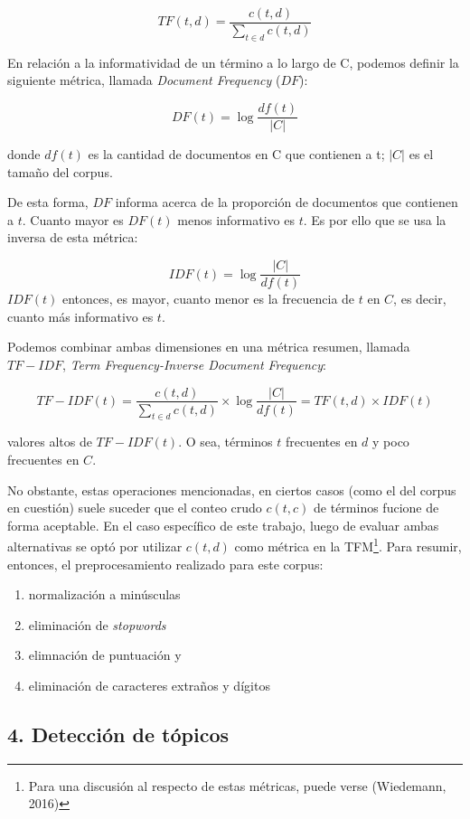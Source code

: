 \documentclass[]{article}
\providecommand{\tightlist}{%
  \setlength{\itemsep}{0pt}\setlength{\parskip}{0pt}}
\let\rmarkdownfootnote\footnote%
\def\footnote{\protect\rmarkdownfootnote}
\begin{document}
\[ TF(t,d) = \frac{c(t,d)}{\sum_{t \in d} c(t,d)}\]

En relación a la informatividad de un término a lo largo de C, podemos
definir la siguiente métrica, llamada \emph{Document Frequency}
(\(DF\)):

\[ DF(t) = \log \frac{df(t)}{|C|}\]

donde \(df(t)\) es la cantidad de documentos en C que contienen a t;
\(|C|\) es el tamaño del corpus.

De esta forma, \(DF\) informa acerca de la proporción de documentos que
contienen a \(t\). Cuanto mayor es \(DF(t)\) menos informativo es \(t\).
Es por ello que se usa la inversa de esta métrica:

\[ IDF(t) = \log \frac{|C|}{df(t)}\] \(IDF(t)\) entonces, es mayor,
cuanto menor es la frecuencia de \(t\) en \(C\), es decir, cuanto más
informativo es \(t\).

Podemos combinar ambas dimensiones en una métrica resumen, llamada
\(TF−IDF\), \emph{Term Frequency-Inverse Document Frequency}:

\[TF-IDF(t) = \frac{c(t,d)}{\sum_{t \in d} c(t,d)} \times \log \frac{|C|}{df(t)} = TF(t,d) \times IDF(t) \]

valores altos de \(TF-IDF(t)\). O sea, términos \(t\) frecuentes en
\(d\) y poco frecuentes en \(C\).

No obstante, estas operaciones mencionadas, en ciertos casos (como el
del corpus en cuestión) suele suceder que el conteo crudo \(c(t,c)\) de
términos fucione de forma aceptable. En el caso específico de este
trabajo, luego de evaluar ambas alternativas se optó por utilizar
\(c(t, d)\) como métrica en la TFM\footnote{Para una discusión al
  respecto de estas métricas, puede verse (Wiedemann, 2016)}. Para
resumir, entonces, el preprocesamiento realizado para este corpus:

\begin{enumerate}
\def\labelenumi{\arabic{enumi}.}
\tightlist
\item
  normalización a minúsculas
\item
  eliminación de \emph{stopwords}
\item
  elimnación de puntuación y
\item
  eliminación de caracteres extraños y dígitos
\end{enumerate}

\subsection{4. Detección de tópicos}\label{detecciuxf3n-de-tuxf3picos}
\end{document}
